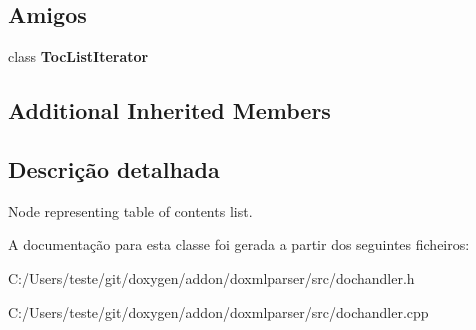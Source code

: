\subsection*{Amigos}
\begin{DoxyCompactItemize}
\item 
\hypertarget{class_toc_list_handler_a408a0a39bf0ac772f670068b0d8c2892}{class {\bfseries Toc\-List\-Iterator}}\label{class_toc_list_handler_a408a0a39bf0ac772f670068b0d8c2892}

\end{DoxyCompactItemize}
\subsection*{Additional Inherited Members}


\subsection{Descrição detalhada}
Node representing table of contents list. 



A documentação para esta classe foi gerada a partir dos seguintes ficheiros\-:\begin{DoxyCompactItemize}
\item 
C\-:/\-Users/teste/git/doxygen/addon/doxmlparser/src/dochandler.\-h\item 
C\-:/\-Users/teste/git/doxygen/addon/doxmlparser/src/dochandler.\-cpp\end{DoxyCompactItemize}
